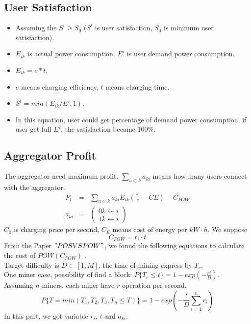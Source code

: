 \documentclass[a4paper]{article}
\begin{document}
\subsection{User Satisfaction}
\begin{itemize}
	\item Assuming the $S^{t}  \geq S_0$	($S^t$ is user satisfaction, $S_0$ is minimum user satisfaction).
	\item $E_{ik}$ is actual power consumption. $E'$ is user demand power consumption.
	\item $E_{ik} = e*t$.
	\item $e$ means charging efficiency, $t$ means charging time.
	\item $S^t =min(E_{ik}/E',1)$.
	\item In this equation, user could get percentage of demand power consumption, if user get full $E'$, the satisfaction became $100\%$.
	
\end{itemize}

\subsection{Aggregator Profit}
The aggregator need maximum profit. $\sum_{u\subset k}^{}a_{ki}$ means how many users connect with the aggregator.
\begin{eqnarray}
	P_t &=& \sum_{u\subset k}^{}a_{ki}E_{ik}( \frac{c_0}{e}-CE)-C_{POW} \label{ap} \\
	a_{ki} &=& \left(\begin{array}{cc}
	0  k\nleftarrow i \\ 1  k\leftarrow i \end{array}\right)
\end{eqnarray}
$C_0$ is charging price per second, $C_E$ means cost of energy per $kW\cdot h$. We suppose 
\begin{equation}
	C_{POW}=r_i \cdot t
\end{equation}
From the Paper $"POS  VS POW"$, we found the following equations to calculate the cost of $POW (C_{POW})$ .\\
Target difficulty is $D\subset [1,M]$, the time of mining express by $T_r$. \\
One miner case, possibility of find a block: $P \{T_r\leq t\}=1-exp(-\frac{rt}{D})$.\\
Assuming $n$ miners, each miner have $r$ operation per second. 
$$P \{T=min(T_1,T_2,T_3,T_n\leq T) \}=1-exp(-\frac{t}{D}\sum_{i=1}^{n}r_i )$$
In this part, we got variable $r_i$, $t$ and $a_{ki}$.
\end{document}
